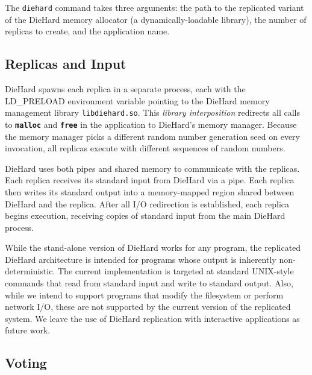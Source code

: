 \documentclass{sig-alternate}
\newcommand{\punt}[1]{}
\newcommand{\cfunction}[1]{{\bf \tt #1}}
\newcommand{\malloc}{\cfunction{malloc}}
\newcommand{\free}{\cfunction{free}}
\begin{document}
\punt{
 The actual application
is invoked at the command line as follows:

\lstset{numbers=none}
\begin{lstlisting}
% diehard libdiehard_r.so 3 theApplication
\end{lstlisting}
}

The \texttt{diehard} command takes three arguments: the path to the
replicated variant of the DieHard memory allocator (a
dynamically-loadable library), the number of replicas to create, and
the application name.

\subsection{Replicas and Input}
\label{sec:replication-replicas}

\noindent
DieHard spawns each replica in a separate process, each with the
LD\_PRELOAD environment variable pointing to the DieHard memory
management library
\texttt{libdiehard.so}. This {\em library interposition} redirects all calls to \malloc{} and
\free{} in the application to DieHard's memory manager. Because the memory
manager picks a different random number generation seed on every
invocation, all replicas execute with different sequences of random
numbers.

DieHard uses both pipes and shared memory to communicate with the
replicas. Each replica receives its standard input from DieHard via a
pipe. Each replica then writes its standard output into a
memory-mapped region shared between DieHard and the replica. After all
I/O redirection is established, each replica begins execution,
receiving copies of standard input from the main DieHard process.

While the stand-alone version of DieHard works for any program, the
replicated DieHard architecture is intended for programs whose
output is inherently non-deterministic. The current implementation is
targeted at standard UNIX-style commands that read from standard input
and write to standard output. Also, while we intend to support
programs that modify the filesystem or perform network I/O, these are
not supported by the current version of the replicated system. We
leave the use of DieHard replication with interactive applications as
future work.

\subsection{Voting}
\end{document}
